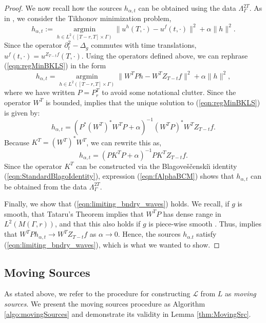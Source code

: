 \documentclass[final,leqno]{siamart1116}
\begin{document}
\begin{proof}
  We now recall how the sources $h_{\alpha,t}$ can be obtained using
  the data $\Lambda_{\Gamma}^{2T}$. As in \cite{Bingham2008}, we
  consider the Tikhonov minimization problem,
  \begin{equation}
    \label{eqn:regMinBKLS}
    h_{\alpha,t} := \operatorname*{argmin}_{h\in L^2([T-r,T]\times\Gamma)} \|u^h(T,\cdot) - u^f(t,\cdot) \|^2 + \alpha \|h\|^2.
  \end{equation}
  Since the operator ${\partial}_t^2 - \Delta_g$ commutes with time
  translations, $u^f(t,\cdot) = u^{Z_{T-t}f}(T,\cdot)$. Using
  the operators defined above, we can rephrase (\ref{eqn:regMinBKLS})
  in the form
  \begin{equation}
    h_{\alpha,t} = \operatorname*{argmin}_{h\in L^2([T-r,T]\times\Gamma)} \|W^TP h - W^TZ_{T-t}f \|^2 + \alpha \|h\|^2,
  \end{equation}
  where we have written $P = P_r^T$ to avoid some notational clutter.  Since
  the operator $W^T$ is bounded, \cite[Thm. 2.11]{Kirsch2011} implies
  that the unique solution to (\ref{eqn:regMinBKLS}) is given by:
  \begin{equation}
    h_{\alpha,t} = \left(P^*(W^T)^*W^T P + \alpha\right)^{-1} (W^T P)^* W^TZ_{T-t}f. 
  \end{equation}
  Because $K^T = (W^T)^*W^T$, we can rewrite this as,
  \begin{equation}
    \label{eqn:fAlphaBCM}
    h_{\alpha,t}  = (P K^T P + \alpha)^{-1} P K^TZ_{T-t}f.
  \end{equation}
  Since the operator $K^T$ can be constructed via the
  Blagove{\v{s}}{\v{c}}enski{\u\i} identity
  (\ref{eqn:StandardBlagoIdentity}), expression (\ref{eqn:fAlphaBCM})
  shows that $h_{\alpha,t}$ can be obtained from the data
  $\Lambda_{\Gamma}^{2T}$. 

  Finally, we show that (\ref{eqn:limiting_bndry_waves}) holds. We
  recall, if $g$ is smooth, that Tataru's Theorem \cite{Tataru1995}
  implies that $W^T P$ has dense range in $L^2(M(\Gamma,r))$, and that this
  also holds if $g$ is piece-wise smooth
  \cite{Kirpichnikova2012}. Thus, \cite[Lemma 1]{Oksanen2013} implies
  that $W^TP h_{\alpha,t} \rightarrow W^TZ_{T-t}f$ as $\alpha
  \rightarrow 0$. Hence, the sources $h_{\alpha.t}$ satisfy
  (\ref{eqn:limiting_bndry_waves}), which is what we wanted to show.
  \qquad
\end{proof}

\subsection{Moving Sources}
\label{subsec:MovingSrc}
As stated above, we refer to the procedure for constructing ${\mathcal{L}}$ from
$L$ as \emph{moving sources}. We present the moving sources procedure
as Algorithm \ref{algo:movingSources} and demonstrate its validity in
Lemma \ref{thm:MovingSrc}.
\end{document}
